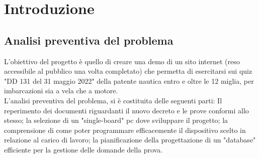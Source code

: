 \chapter{Introduzione}\label{cap:Introduzione}

\section{Analisi preventiva del problema}\label{sez:Analisi preventiva}

L'obiettivo del progetto è quello di creare una demo di un sito internet (reso accessibile al pubblico una volta completato) che permetta di esercitarsi sui quiz "DD 131 del 31 maggio 2022" della patente nautica entro e oltre le 12 miglia, per imbarcazioni sia a vela che a motore.\\
L'analisi preventiva del problema, si è costituita delle seguenti parti: Il reperimento dei documenti riguardanti il nuovo decreto e le prove conformi allo stesso; la selezione di un "single-board" pc dove sviluppare il progetto; la comprensione di come poter programmare efficacemente il dispositivo scelto in relazione al carico di lavoro; la pianificazione della progettazione di un "database" efficiente per la gestione delle domande della prova.\\

